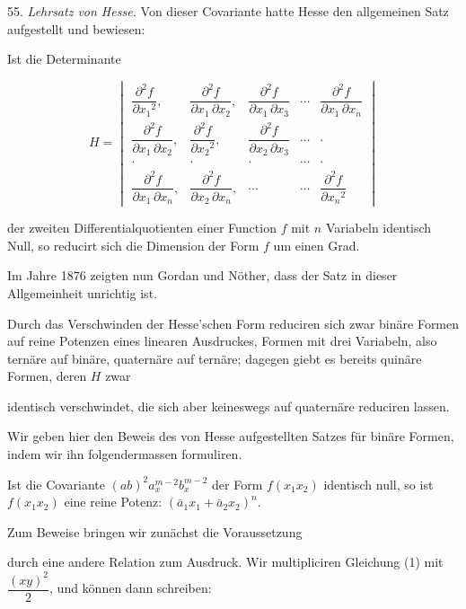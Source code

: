 55. \textit{Lehrsatz von Hesse.} Von dieser Covariante hatte Hesse den allgemeinen Satz aufgestellt und bewiesen:

\glqq Ist die Determinante

\[
H =
\begin{vmatrix}
\dfrac{\partial^2 f}{\partial x_1{}^2}, & \dfrac{\partial^2 f}{\partial x_1\,\partial x_2}, & \dfrac{\partial^2 f}{\partial x_1\,\partial x_3} & \cdots & \dfrac{\partial^2 f}{\partial x_1\,\partial x_n} \\
\dfrac{\partial^2 f}{\partial x_1\,\partial x_2}, & \dfrac{\partial^2 f}{\partial x_2{}^2}, & \dfrac{\partial^2 f}{\partial x_2\,\partial x_3} & \cdots & \cdot \\
\cdot & \cdot & \cdot & \cdots & \cdot \\
\dfrac{\partial^2 f}{\partial x_1\,\partial x_n}, & \dfrac{\partial^2 f}{\partial x_2\,\partial x_n}, & \cdots & \cdots & \dfrac{\partial^2 f}{\partial x_n{}^2}
\end{vmatrix}
\]

der zweiten Differentialquotienten einer Function $f$ mit $n$ Variabeln identisch Null, so reducirt sich die Dimension der Form $f$ um einen Grad.\grqq{}

Im Jahre 1876 zeigten nun Gordan und Nöther, dass der Satz in dieser Allgemeinheit unrichtig ist.

Durch das Verschwinden der Hesse'schen Form reduciren sich zwar binäre Formen auf reine Potenzen eines linearen Ausdruckes, Formen mit drei Variabeln, also ternäre auf binäre, quaternäre auf ternäre; dagegen giebt es bereits quinäre Formen, deren $H$ zwar


identisch verschwindet, die sich aber keineswegs auf quaternäre reduciren lassen.

Wir geben hier den Beweis des von Hesse aufgestellten Satzes für binäre Formen, indem wir ihn folgendermassen formuliren.

\glqq Ist die Covariante $(ab)^2 a_x^{m-2}b_x^{m-2}$ der Form $f(x_1 x_2)$ identisch null, so ist $f(x_1 x_2)$ eine reine Potenz: $(\bar a_1 x_1 + \bar a_2 x_2)^n$.\grqq{}

Zum Beweise bringen wir zunächst die Voraussetzung


durch eine andere Relation zum Ausdruck. Wir multipliciren Gleichung (1) mit $\dfrac{(xy)^2}{2}$, und können dann schreiben:


